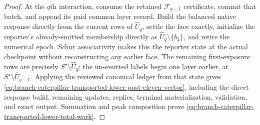 \begin{proof}
At the $q$th interaction, consume the retained
$\mathcal F_{q-1}$ certificate, commit that batch, and append its paid common
layer record.  Build the balanced
native response directly from the current rows of $\widehat U_q$, settle the
face exactly, initialize the reporter's already-emitted membership directly
as $\widehat U_q\setminus\{b_1\}$, and retire the numerical epoch.  Schur
associativity makes this the reporter state at the actual checkpoint without
reconstructing any earlier face.  The remaining first-exposure rows are precisely
$S^\star\setminus\widehat U_q$; the un-emitted labels begin one layer earlier,
at $S^\star\setminus\widehat U_{q-1}$.  Applying the reviewed canonical
ledger from that state gives
\cref{eq:branch-caterpillar-transported-lower-post-eleven-vector}, including
the direct response build, remaining updates, replies, terminal
materialization, validation, and exact output.  Summation and peak
composition prove
\cref{eq:branch-caterpillar-transported-lower-total-work}.
\end{proof}

